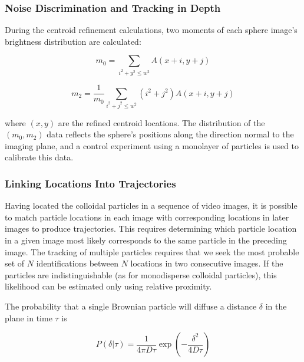 \subsubsection{Noise Discrimination and Tracking in Depth}

During the centroid refinement calculations, two moments of each sphere image's brightness 
distribution are calculated:

\begin{center}\begin{equation}
m_0 = \sum_{i^2+y^2 \leq w^2} A(x+i,y+j)
\end{equation}\end{center}

\begin{center}\begin{equation}m_2 = \frac{1}{m_0} \sum_{i^2+j^2 \leq w^2} (i^2 + j^2)A(x+i,y+j)
\end{equation}\end{center}

where $(x,y)$ are the refined centroid locations.  The distribution of the $(m_0,m_2)$ data reflects the
sphere's positions along the direction normal to the imaging plane, and a control experiment using a 
monolayer of particles is used to calibrate this data.

\subsubsection{Linking Locations Into Trajectories}
\label{sec:time-tracking}

Having located the colloidal particles in a sequence of video images, it is possible to 
match particle locations in each image with corresponding locations in later images to produce
trajectories.  This requires determining which particle location in a given image
most likely corresponds to the same particle in the preceding image.  The tracking of 
multiple particles requires that we seek the most probable set of $N$ identifications 
between $N$ locations in two consecutive images. If the particles are indistinguishable (as for
monodisperse colloidal particles), this likelihood can be estimated only using relative
proximity.

The probability that a single Brownian particle will diffuse a distance $\delta$ in the plane 
in time $\tau$ is

\begin{center}\begin{equation}P(\delta|\tau) = \frac{1}{4\pi D\tau} \exp{ \left( -\frac{\delta^2}{4D\tau} \right) }
\end{equation}\end{center}

